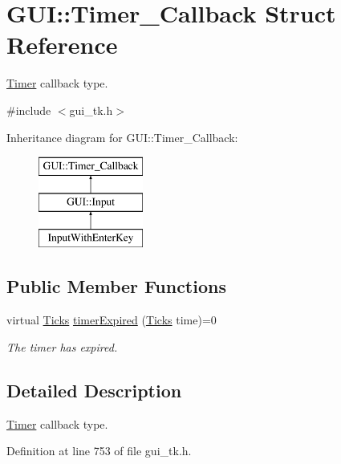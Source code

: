 \hypertarget{structGUI_1_1Timer__Callback}{\section{G\-U\-I\-:\-:Timer\-\_\-\-Callback Struct Reference}
\label{structGUI_1_1Timer__Callback}
}


\hyperlink{classGUI_1_1Timer}{Timer} callback type.  




{\ttfamily \#include $<$gui\-\_\-tk.\-h$>$}

Inheritance diagram for G\-U\-I\-:\-:Timer\-\_\-\-Callback\-:\begin{figure}[H]
\begin{center}
\leavevmode
\includegraphics[height=3.000000cm]{structGUI_1_1Timer__Callback}
\end{center}
\end{figure}
\subsection*{Public Member Functions}
\begin{DoxyCompactItemize}
\item 
virtual \hyperlink{namespaceGUI_af396fee5d5c26b98218f5803f85e3b65}{Ticks} \hyperlink{structGUI_1_1Timer__Callback_a4b5a610f3c4da4acd0bacda97b24e049}{timer\-Expired} (\hyperlink{namespaceGUI_af396fee5d5c26b98218f5803f85e3b65}{Ticks} time)=0
\begin{DoxyCompactList}\small\item\em The timer has expired. \end{DoxyCompactList}\end{DoxyCompactItemize}


\subsection{Detailed Description}
\hyperlink{classGUI_1_1Timer}{Timer} callback type. 

Definition at line 753 of file gui\-\_\-tk.\-h.



